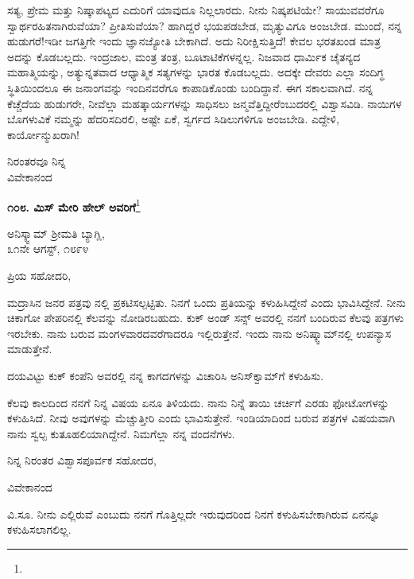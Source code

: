 ಸತ್ಯ, ಪ್ರೇಮ ಮತ್ತು ನಿಷ್ಕಾಪಟ್ಯದ ಎದುರಿಗೆ ಯಾವುದೂ ನಿಲ್ಲಲಾರದು. ನೀನು ನಿಷ್ಕಪಟಿಯೇ? ಸಾಯುವವರೆಗೂ ಸ್ವಾರ್ಥರಹಿತನಾಗಿರುವೆಯಾ? ಪ್ರೀತಿಸುವೆಯಾ? ಹಾಗಿದ್ದರೆ ಭಯಪಡಬೇಡ, ಮೃತ್ಯುವಿಗೂ ಅಂಜಬೇಡ. ಮುಂದೆ, ನನ್ನ ಹುಡುಗರೆ!ಇಡೀ ಜಗತ್ತಿಗೇ ಇಂದು ಜ್ಞಾನಜ್ಯೋತಿ ಬೇಕಾಗಿದೆ. ಅದು ನಿರೀಕ್ಷಿಸುತ್ತಿದೆ! ಕೇವಲ ಭರತಖಂಡ ಮಾತ್ರ ಅದನ್ನು ಕೊಡಬಲ್ಲದು. ಇಂದ್ರಜಾಲ, ಮಂತ್ರ ತಂತ್ರ, ಬೂಟಾಟಿಕೆಗಳನ್ನಲ್ಲ. ನಿಜವಾದ ಧಾರ್ಮಿಕ ಚೈತನ್ಯದ ಮಹಾತ್ಮಿಯನ್ನು, ಅತ್ಯುನ್ನತವಾದ ಆಧ್ಯಾತ್ಮಿಕ ಸತ್ಯಗಳನ್ನು ಭಾರತ ಕೊಡಬಲ್ಲದು. ಅದಕ್ಕೇ ದೇವರು ಎಲ್ಲಾ ಸಂದಿಗ್ಧ ಸ್ಥಿತಿಯಿಂದಲೂ ಈ ಜನಾಂಗವನ್ನು ಇಂದಿನವರೆಗೂ ಕಾಪಾಡಿಕೊಂಡು ಬಂದಿದ್ದಾನೆ. ಈಗ ಸಕಾಲವಾಗಿದೆ. ನನ್ನ ಕೆಚ್ಚೆದೆಯ ಹುಡುಗರೇ, ನೀವೆಲ್ಲಾ ಮಹತ್ಕಾರ್ಯಗಳನ್ನು ಸಾಧಿಸಲು ಜನ್ಮವೆತ್ತಿದ್ದೀರೆಂಬು\-ದರಲ್ಲಿ ವಿಶ್ವಾಸವಿಡಿ. ನಾಯಿಗಳ ಬೊಗಳುವಿಕೆ ನಮ್ಮನ್ನು ಹೆದರಿಸದಿರಲಿ, ಅಷ್ಟೇ ಏಕೆ, ಸ್ವರ್ಗದ ಸಿಡಿಲುಗಳಿಗೂ ಅಂಜಬೇಡಿ. ಎದ್ದೇಳಿ, ಕಾರ್ಯೋನ್ಮುಖರಾಗಿ!

{\flushright
ನಿರಂತರವೂ ನಿನ್ನ\\ವಿವೇಕಾನಂದ\par}

\begin{center}
\textbf{೧೦೮. ಮಿಸ್ ಮೇರಿ ಹೇಲ್‌ ಅವರಿಗೆ}\footnote{}
\end{center}

\begin{flushright}
ಅನಿಸ್ಕ್ವಾಮ್  ಶ‍್ರೀಮತಿ ಬ್ಯಾಗ್ಲಿ,\\೩೧ನೇ ಆಗಸ್ಟ್, ೧೮೯೪
\end{flushright}

\noindent
ಪ್ರಿಯ ಸಹೋದರಿ,

\vspace{0.1cm}

ಮದ್ರಾಸಿನ ಜನರ ಪತ್ರವು  ನಲ್ಲಿ ಪ್ರಕಟಿಸಲ್ಪಟ್ಟಿತು. ನಿನಗೆ ಒಂದು ಪ್ರತಿಯನ್ನು ಕಳುಹಿಸಿದ್ದೇನೆ ಎಂದು ಭಾವಿಸಿದ್ದೇನೆ. ನೀನು ಚಿಕಾಗೋ ಪೇಪರಿನಲ್ಲಿ ಕೆಲವನ್ನು ನೋಡಿರಬಹುದು. ಕುಕ್ ಅಂಡ್ ಸನ್ಸ್ ಅವರಲ್ಲಿ ನನಗೆ ಬಂದಿರುವ ಕೆಲವು ಪತ್ರಗಳು ಇರಬೇಕು. ನಾನು ಬರುವ ಮಂಗಳವಾರದವರೆಗಾದರೂ ಇಲ್ಲಿರುತ್ತೇನೆ. ಇಂದು ನಾನು ಅನಿಷ್ಕ್ವಾಮ್‌ನಲ್ಲಿ ಉಪನ್ಯಾಸ ಮಾಡುತ್ತೇನೆ.

ದಯವಿಟ್ಟು ಕುಕ್ ಕಂಪೆನಿ ಅವರಲ್ಲಿ ನನ್ನ ಕಾಗದಗಳನ್ನು ವಿಚಾರಿಸಿ ಅನಿಸ್‌ಕ್ವಾಮ್‌ಗೆ ಕಳುಹಿಸು.

ಕೆಲವು ಕಾಲದಿಂದ ನನಗೆ ನಿನ್ನ ವಿಷಯ ಏನೂ ತಿಳಿಯದು. ನಾನು ನಿನ್ನೆ ತಾಯಿ ಚರ್ಚಿಗೆ ಎರಡು ಫೋಟೋಗಳನ್ನು ಕಳುಹಿಸಿದೆ. ನೀವು ಅವುಗಳನ್ನು ಮೆಚ್ಚುತ್ತೀರಿ ಎಂದು ಭಾವಿಸುತ್ತೇನೆ. ಇಂಡಿಯಾದಿಂದ ಬರುವ ಪತ್ರಗಳ ವಿಷಯವಾಗಿ ನಾನು ಸ್ವಲ್ಪ ಕುತೂಹಲಿಯಾಗಿದ್ದೇನೆ. ನಿಮಗೆಲ್ಲಾ ನನ್ನ ವಂದನೆಗಳು.

ನಿನ್ನ ನಿರಂತರ ವಿಶ್ವಾಸಪೂರ್ವಕ ಸಹೋದರ,

\begin{flushright}
ವಿವೇಕಾನಂದ
\end{flushright}

ವಿ.ಸೂ. \enginline{-}ನೀನು ಎಲ್ಲಿರುವೆ ಎಂಬುದು ನನಗೆ ಗೊತ್ತಿಲ್ಲದೇ ಇರುವುದರಿಂದ ನಿನಗೆ ಕಳುಹಿಸಬೇಕಾಗಿರುವ ಏನನ್ನೂ ಕಳುಹಿಸಲಾಗಲಿಲ್ಲ.

